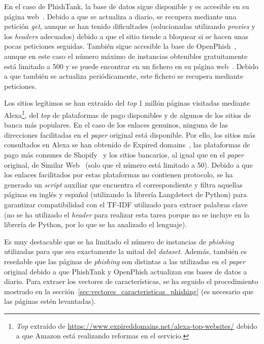En el caso de PhishTank, la base de datos sigue disponible y es accesible en su página web~\cite{phishTankDB}. Debido a que se actualiza a diario, se recupera mediante una petición \textit{get}, aunque se han tenido dificultades (solucionadas utilizando \textit{proxies} y los \textit{headers} adecuados) debido a que el sitio tiende a bloquear si se hacen unas pocas peticiones seguidas. También sigue accesible la base de OpenPhish~\cite{openFishDB}, aunque en este caso el número máximo de instancias obtenibles gratuitamente está limitado a 500 y se puede encontrar en un fichero en su página web~\cite{openFishFile}. Debido a que también se actualiza periódicamente, este fichero se recupera mediante peticiones.

Los sitios legítimos se han extraído del \textit{top} 1 millón páginas visitadas mediante Alexa\footnote{\textit{Top} extraído de \url{https://www.expireddomains.net/alexa-top-websites/} debido a que Amazon está realizando reformas en el servicio.}, del \textit{top} de plataformas de pago disponibles y de algunos de los sitios de banca más populares. En el caso de los enlaces genuinos, ninguna de las direcciones facilitadas en el \textit{paper} original está disponible. Por ello, los sitios más consultados en Alexa se han obtenido de Expired domains~\cite{AlexaTopWebsites}, las plataformas de pago más comunes de Shopify~\cite{paymentGatewaysWebsites} y los sitios bancarios, al igual que en el \textit{paper} original, de Similar Web~\cite{banksitesTop} (solo que el número está limitado a 50). Debido a que los enlaces facilitados por estas plataformas no contienen protocolo, se ha generado un \textit{script} auxiliar que encuentra el correspondiente y filtra aquellas páginas en inglés y español (utilizando la librería Langdetect de Python) para garantizar compatibilidad con el TF-IDF utilizado para extraer palabras clave (no se ha utilizado el \textit{header} para realizar esta tarea porque no se incluye en la librería de Python, por lo que se ha analizado el lenguaje).

Es muy destacable que se ha limitado el número de instancias de \textit{phishing} utilizadas para que sea exactamente la mitad del \textit{dataset}. Además, también es reseñable que las páginas de \textit{phishing} son distintas a las utilizadas en el \textit{paper} original debido a que PhishTank y OpenPhish actualizan sus bases de datos a diario. Para extraer los vectores de características, se ha seguido el procedimiento mostrado en la sección~\ref{sec:vectores_caracteristicas_phishing} (es necesario que las páginas estén levantadas).

